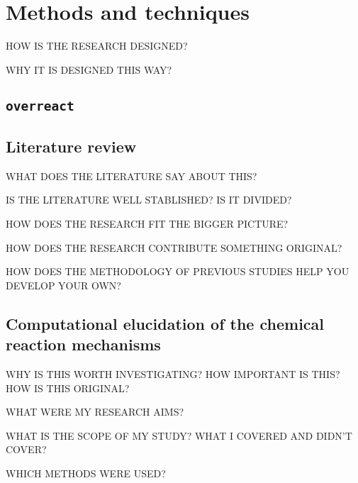 \chapter{Methods and techniques}%
\label{ch:methods}

HOW IS THE RESEARCH DESIGNED?\@

WHY IT IS DESIGNED THIS WAY?\@

\section{\texttt{overreact}}%
\label{sec:overreact-methods}

\section{Literature review}%
\label{sec:literature-review}

WHAT DOES THE LITERATURE SAY ABOUT THIS?\@

IS THE LITERATURE WELL STABLISHED?\@
IS IT DIVIDED?\@

HOW DOES THE RESEARCH FIT THE BIGGER PICTURE?\@

HOW DOES THE RESEARCH CONTRIBUTE SOMETHING ORIGINAL?\@

HOW DOES THE METHODOLOGY OF PREVIOUS STUDIES HELP YOU DEVELOP YOUR OWN?\@

\section{Computational elucidation of the chemical reaction mechanisms}

WHY IS THIS WORTH INVESTIGATING?\@
HOW IMPORTANT IS THIS?\@
HOW IS THIS ORIGINAL?\@

WHAT WERE MY RESEARCH AIMS?\@

WHAT IS THE SCOPE OF MY STUDY?\@
WHAT I COVERED AND DIDN'T COVER?\@

WHICH METHODS WERE USED?\@

